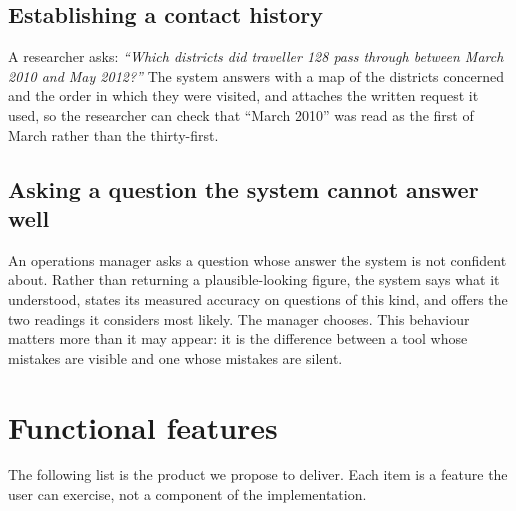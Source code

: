 \documentclass[12pt,a4paper]{report}
\begin{document}
\subsection{Establishing a contact history}

A researcher asks: \emph{``Which districts did traveller 128 pass through
between March 2010 and May 2012?''} The system answers with a map of the
districts concerned and the order in which they were visited, and attaches the
written request it used, so the researcher can check that ``March 2010'' was
read as the first of March rather than the thirty-first.

\subsection{Asking a question the system cannot answer well}

An operations manager asks a question whose answer the system is not confident
about. Rather than returning a plausible-looking figure, the system says what it
understood, states its measured accuracy on questions of this kind, and offers
the two readings it considers most likely. The manager chooses. This behaviour
matters more than it may appear: it is the difference between a tool whose
mistakes are visible and one whose mistakes are silent.

\section{Functional features}

The following list is the product we propose to deliver. Each item is a feature
the user can exercise, not a component of the implementation.
\end{document}
